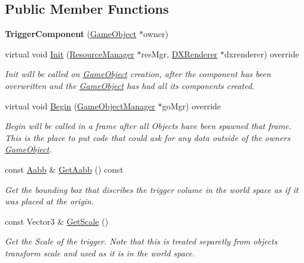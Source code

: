 \subsection*{Public Member Functions}
\begin{DoxyCompactItemize}
\item 
\mbox{\label{classTriggerComponent_a7a0b2f2ed3f3fd915790926cbb6ebe42}} 
{\bfseries Trigger\+Component} (\hyperlink{classGameObject}{Game\+Object} $\ast$owner)
\item 
virtual void \hyperlink{classTriggerComponent_a4d843989a23752f91dfd1fe8c75c2b7c}{Init} (\hyperlink{classResourceManager}{Resource\+Manager} $\ast$res\+Mgr, \hyperlink{classDXRenderer}{D\+X\+Renderer} $\ast$dxrenderer) override
\begin{DoxyCompactList}\small\item\em Init will be called on \hyperlink{classGameObject}{Game\+Object} creation, after the component has been overwritten and the \hyperlink{classGameObject}{Game\+Object} has had all its components created. \end{DoxyCompactList}\item 
virtual void \hyperlink{classTriggerComponent_a095e19d7f322e6e117bdbd5001015b8b}{Begin} (\hyperlink{classGameObjectManager}{Game\+Object\+Manager} $\ast$go\+Mgr) override
\begin{DoxyCompactList}\small\item\em Begin will be called in a frame after all Objects have been spawned that frame. This is the place to put code that could ask for any data outside of the owner\textquotesingle{}s \hyperlink{classGameObject}{Game\+Object}. \end{DoxyCompactList}\item 
const \hyperlink{classAabb}{Aabb} \& \hyperlink{classTriggerComponent_ae88aa2832f7e3f5bd90779c9ef7ebfb9}{Get\+Aabb} () const
\begin{DoxyCompactList}\small\item\em Get the bounding box that discribes the trigger volume in the world space as if it was placed at the origin. \end{DoxyCompactList}\item 
const Vector3 \& \hyperlink{classTriggerComponent_af2159e7d62a5dade58a8d5d390b8dbe4}{Get\+Scale} ()
\begin{DoxyCompactList}\small\item\em Get the Scale of the trigger. Note that this is treated separetly from objects transform scale and used as it is in the world space. \end{DoxyCompactList}\item 

\end{DoxyCompactItemize}
